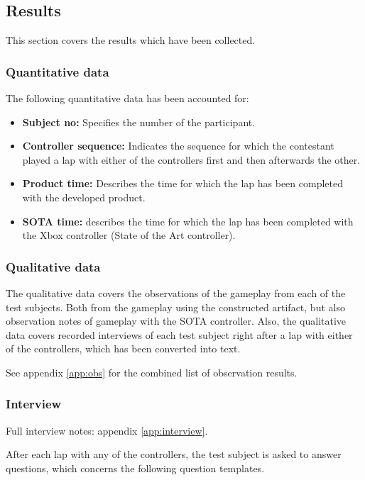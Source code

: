 \subsection{Results} \label{sec:results}
This section covers the results which have been collected.


\subsubsection{Quantitative data}
The following quantitative data has been accounted for:

\begin{itemize}
\item \textbf{Subject no:} Specifies the number of the participant.
\item \textbf{Controller sequence:} Indicates the sequence for which the contestant played a lap with either of the controllers first and then afterwards the other.
\item \textbf{Product time:} Describes the time for which the lap has been completed with the developed product.
\item \textbf{SOTA time:} describes the time for which the lap has been completed with the Xbox controller (State of the Art controller).
\end{itemize}




\subsubsection{Qualitative data}
The qualitative data covers the observations of the gameplay from each of the test subjects. Both from the gameplay using the constructed artifact, but also observation notes of gameplay with the SOTA controller.
Also, the qualitative data covers recorded interviews of each test subject right after a lap with either of the controllers, which has been converted into text.

See appendix \ref{app:obs} for the combined list of observation results.


\subsubsection{Interview}
Full interview notes: appendix \ref{app:interview}.

After each lap with any of the controllers, the test subject is asked to answer questions, which concerns the following question templates.

